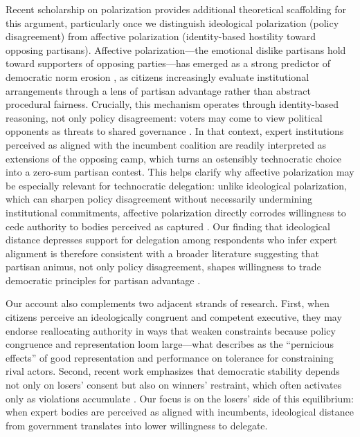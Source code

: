 \documentclass[11pt]{article}\usepackage[]{graphicx}\usepackage[]{xcolor}
\begin{document}
Recent scholarship on polarization provides additional theoretical scaffolding for this argument, particularly once we distinguish ideological polarization (policy disagreement) from affective polarization (identity-based hostility toward opposing partisans). Affective polarization---the emotional dislike partisans hold toward supporters of opposing parties---has emerged as a strong predictor of democratic norm erosion \parencite{Foa2025}, as citizens increasingly evaluate institutional arrangements through a lens of partisan advantage rather than abstract procedural fairness. Crucially, this mechanism operates through identity-based reasoning, not only policy disagreement: voters may come to view political opponents as threats to shared governance \parencite{Gessler:2025}. In that context, expert institutions perceived as aligned with the incumbent coalition are readily interpreted as extensions of the opposing camp, which turns an ostensibly technocratic choice into a zero-sum partisan contest. This helps clarify why affective polarization may be especially relevant for technocratic delegation: unlike ideological polarization, which can sharpen policy disagreement without necessarily undermining institutional commitments, affective polarization directly corrodes willingness to cede authority to bodies perceived as captured \parencite{Orhan:2022}. Our finding that ideological distance depresses support for delegation among respondents who infer expert alignment is therefore consistent with a broader literature suggesting that partisan animus, not only policy disagreement, shapes willingness to trade democratic principles for partisan advantage \parencite{Simonovits:2022}.

Our account also complements two adjacent strands of research. First, when citizens perceive an ideologically congruent and competent executive, they may endorse reallocating authority in ways that weaken constraints because policy congruence and representation loom large---what \textcite{Singer2018} describes as the ``pernicious effects'' of good representation and performance on tolerance for constraining rival actors. Second, recent work emphasizes that democratic stability depends not only on losers' consent but also on winners' restraint, which often activates only as violations accumulate \parencite{Werner2025}. Our focus is on the losers' side of this equilibrium: when expert bodies are perceived as aligned with incumbents, ideological distance from government translates into lower willingness to delegate.
\end{document}

